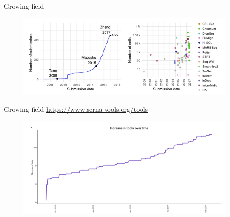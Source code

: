 \documentclass{beamer}\usepackage[]{graphicx}\usepackage[]{color}
\begin{document}
\begin{frame}
\begin{block}{Growing field}
\vspace{0.5cm}
\begin{center}
\begin{figure}
\includegraphics[width=11cm]{Images/Angerer-datasets.png}
\caption{\cite{Angerer2017}}
\end{figure}
\end{center}
\end{block}
\end{frame}

\begin{frame}
\begin{block}{Growing field}
\href{https://www.scrna-tools.org/tools}{https://www.scrna-tools.org/tools}
\vspace{0.5cm}
\begin{center}
\begin{figure}
\includegraphics[height=5cm]{Images/Oshlack-tools.png}
\caption{\cite{Zappia2018}}
\end{figure}
\end{center}
\end{block}
\end{frame}
\end{document}
